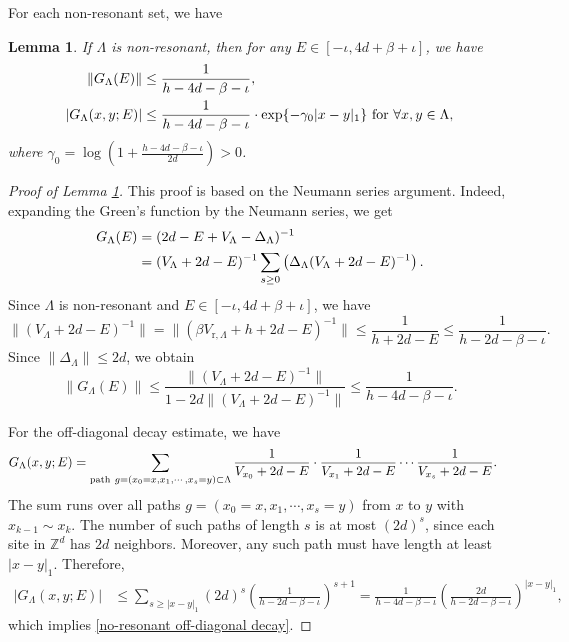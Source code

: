 \documentclass[11pt,reqno,UTF8,twoside]{amsart}
\newcommand{\Z}{\mathbb{Z}}
\newtheorem{lem}[thm]{Lemma}
\theoremstyle{definition}
\numberwithin{equation}{section}
\begin{document}
For each non-resonant set, we have %
\begin{lem}\label{non-resonant Green's function}
  If $\Lambda$ is non-resonant, then for any  $E\in [-\iota,4d+\beta+\iota]$, we have
  \begin{align}
   \label{non-resonant L2 norm} \|G_{\Lambda}(E)\|&\leq  \frac{1}{h-4d-\beta-\iota},\\
    \label{no-resonant off-diagonal decay} |G_{\Lambda}(x,y;E)| &\leq  \frac{1}{h-4d-\beta-\iota} \cdot \exp\{-\gamma_0 |x-y|_1\} \ {\rm for}\  \forall x,y \in \Lambda, 
  \end{align}
  where  $\gamma_0=\log(1+\frac{h-4d-\beta-\iota}{2d})>0$.
\end{lem}
\begin{proof}[Proof of Lemma \ref{non-resonant Green's function}]
  This proof is based on the Neumann series argument.  Indeed, 
  expanding the Green's function by the Neumann series, we get 
  \begin{align}\label{Neumann series expansion}
  \notag  G_{\Lambda}(E) & = (2d-E+V_{\Lambda}-\Delta_{\Lambda})^{-1} \\
           &=(V_{\Lambda}+2d-E)^{-1} \sum_{s\geq 0} \left(  \Delta_{\Lambda} (V_{\Lambda}+2d-E)^{-1}\right). 
  \end{align}
  Since $\Lambda$ is non-resonant and $E\in [-\iota,4d+\beta+\iota]$, we have
  \[\| (V_{\Lambda}+2d-E)^{-1} \| =\| (\beta V_{\text{r},\Lambda}+h+2d-E)^{-1}\| \leq \frac{1}{h+2d-E}\leq \frac{1}{h-2d-\beta-\iota}.\]
  Since  $\| \Delta_{\Lambda} \| \leq 2d$, we obtain  
  \[\| G_{\Lambda}(E)\| \leq \frac{\|(V_{\Lambda}+2d-E)^{-1}\| }{1-2d \|(V_{\Lambda}+2d-E)^{-1}\| }\leq \frac{1}{h-4d-\beta-\iota}.\]

  For the off-diagonal decay estimate,    we have
  \begin{align*}
     G_{\Lambda}(x,y;E)  & =\sum_{{\rm path}\ g=(x_0=x, x_1,\cdots,x_s=y)\subset \Lambda} \frac{1}{V_{x_0}+2d-E}\cdot \frac{1}{V_{x_1}+2d-E}\cdots \frac{1}{V_{x_s}+2d-E}.
  \end{align*}
 The sum runs over all paths $g=(x_0=x, x_1,\cdots,x_s=y)$ from $x$ to $y$ with $x_{k-1}\sim x_k$. The number of such paths of length $s$ is at most $(2d)^s$, since each site in $\Z^d$ has $2d$ neighbors. Moreover, any such path must have length at least $|x-y|_1$. Therefore,
   \begin{align*}
    |G_{\Lambda}(x,y;E)| & \leq \sum_{s \geq |x-y|_1} (2d)^s \left(\frac{1}{h-2d-\beta-\iota}\right)^{s+1} =\frac{1}{h-4d-\beta-\iota} \left(\frac{2d}{h-2d-\beta-\iota}\right)^{|x-y|_1},
  \end{align*}
  which implies  \eqref{no-resonant off-diagonal decay}.
\end{proof}
\end{document}

